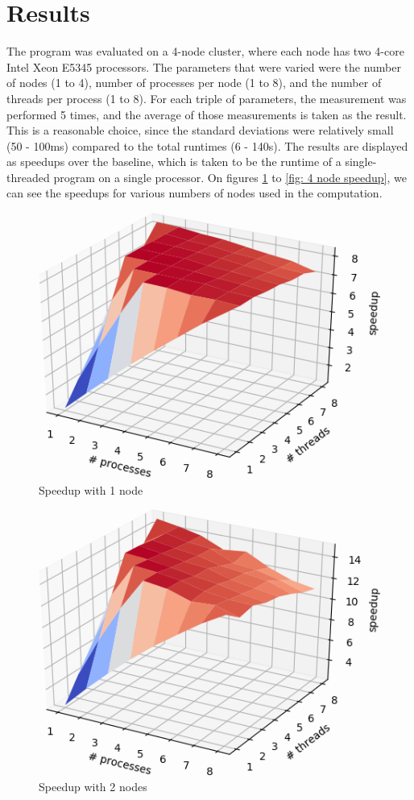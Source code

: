\documentclass[a4paper]{article}
\begin{document}
	\section{Results}
	The program was evaluated on a 4-node cluster, where each node has two 4-core Intel Xeon E5345 processors. The parameters that were varied were the number of nodes (1 to 4), number of processes per node (1 to 8), and the number of threads per process (1 to 8). For each triple of parameters, the measurement was performed 5 times, and the average of those measurements is taken as the result. This is a reasonable choice, since the standard deviations were relatively small (50 - 100ms) compared to the total runtimes (6 - 140s). The results are displayed as speedups over the baseline, which is taken to be the runtime of a single-threaded program on a single processor. On figures \ref{fig: 1 node speedup} to \ref{fig: 4 node speedup}, we can see the speedups for various numbers of nodes used in the computation.  
	
	\begin{figure}
		\centering
		\includegraphics[width=0.8\linewidth]{1node.png}
		\caption{Speedup with 1 node}
		\label{fig: 1 node speedup}
	\end{figure}

	\begin{figure}
		\centering
		\includegraphics[width=0.8\linewidth]{2node.png}
		\caption{Speedup with 2 nodes}
		\label{fig: 2 node speedup}
	\end{figure}
\end{document}
